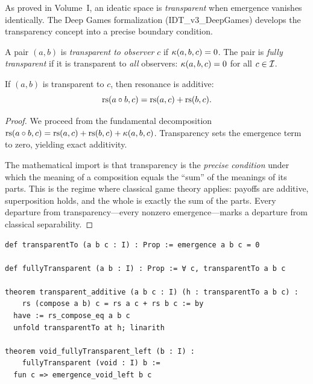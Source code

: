 As proved in Volume~I, an ideatic space is \emph{transparent} when
emergence vanishes identically. The Deep Games formalization (IDT\_v3\_DeepGames)
develops the transparency concept into a precise boundary condition.

\begin{definition}[Transparency]
\label{def:transparency}
A pair $(a, b)$ is \emph{transparent to observer} $c$ if
$\kappa(a, b, c) = 0$. The pair is \emph{fully transparent} if it is
transparent to \emph{all} observers:
$\kappa(a, b, c) = 0$ for all $c \in \mathcal{I}$.
\end{definition}

\begin{theorem}
\label{thm:transparent-additive}
If $(a, b)$ is transparent to $c$, then resonance is additive:
\[
\mathrm{rs}(a \circ b, c) = \mathrm{rs}(a, c) + \mathrm{rs}(b, c).
\]
\end{theorem}

\begin{proof}
We proceed from the fundamental decomposition
$\mathrm{rs}(a \circ b, c) = \mathrm{rs}(a, c) + \mathrm{rs}(b, c) + \kappa(a, b, c)$.
Transparency sets the emergence term to zero, yielding exact additivity.

The mathematical import is that transparency is the \emph{precise condition}
under which the meaning of a composition equals the ``sum'' of the meanings
of its parts. This is the regime where classical game theory applies:
payoffs are additive, superposition holds, and the whole is exactly the
sum of the parts. Every departure from transparency---every nonzero
emergence---marks a departure from classical separability.
\end{proof}

\begin{lstlisting}[caption={Lean 4: Transparency and additivity}]
def transparentTo (a b c : I) : Prop := emergence a b c = 0

def fullyTransparent (a b : I) : Prop := ∀ c, transparentTo a b c

theorem transparent_additive (a b c : I) (h : transparentTo a b c) :
    rs (compose a b) c = rs a c + rs b c := by
  have := rs_compose_eq a b c
  unfold transparentTo at h; linarith

theorem void_fullyTransparent_left (b : I) :
    fullyTransparent (void : I) b :=
  fun c => emergence_void_left b c
\end{lstlisting}

